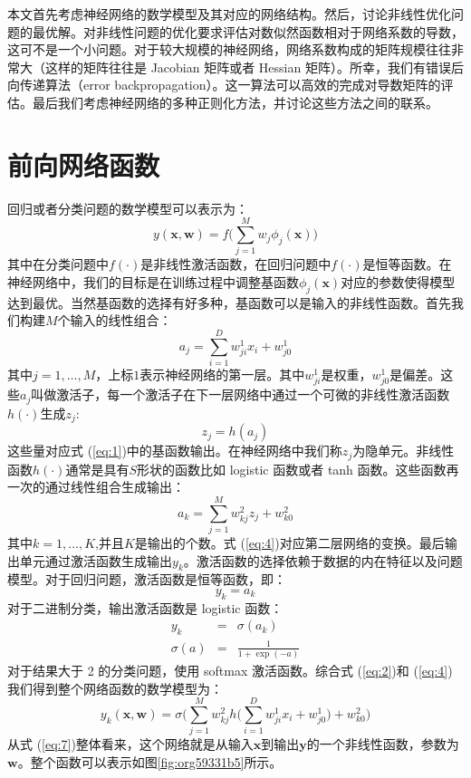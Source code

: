 \documentclass[10pt,a4paper,UTF8]{article}
\begin{document}
本文首先考虑神经网络的数学模型及其对应的网络结构。然后，讨论非线性优化问题的最优解。对非线性问题的优化要求评估对数似然函数相对于网络系数的导数，这可不是一个小问题。对于较大规模的神经网络，网络系数构成的矩阵规模往往非常大（这样的矩阵往往是 Jacobian 矩阵或者 Hessian 矩阵）。所幸，我们有错误后向传递算法（error backpropagation）。这一算法可以高效的完成对导数矩阵的评估。最后我们考虑神经网络的多种正则化方法，并讨论这些方法之间的联系。
\section{前向网络函数}
\label{sec:org1c4e898}


回归或者分类问题的数学模型可以表示为：
\begin{equation}
\label{eq:1}
y(\mathbf{x},\mathbf{w}) = f\bigg( \sum_{j=1}^{M} w_{j}\phi_{j}(\mathbf{x}) \bigg)
\end{equation}
其中在分类问题中\(f(\cdot)\)是非线性激活函数，在回归问题中\(f(\cdot)\)是恒等函数。在神经网络中，我们的目标是在训练过程中调整基函数\(\phi_{j}(\mathbf{x})\)对应的参数使得模型达到最优。当然基函数的选择有好多种，基函数可以是输入的非线性函数。首先我们构建\(M\)个输入的线性组合：
\begin{equation}
\label{eq:2}
a_{j} = \sum_{i=1}^{D}w_{ji}^{1}x_{i} + w_{j0}^{1}
\end{equation}
其中\(j = 1,\ldots ,M\)，上标\(1\)表示神经网络的第一层。其中\(w_{ji}^{1}\)是权重，\(w_{j0}^{1}\)是偏差。这些\(a_{j}\)叫做激活子，每一个激活子在下一层网络中通过一个可微的非线性激活函数\(h(\cdot)\)生成\(z_{j}\):
\begin{equation}
\label{eq:3}
z_{j} = h(a_{j})
\end{equation}
这些量对应式 (\ref{eq:1})中的基函数输出。在神经网络中我们称\(z_{j}\)为隐单元。非线性函数\(h(\cdot)\)通常是具有\(S\)形状的函数比如 logistic 函数或者 tanh 函数。这些函数再一次的通过线性组合生成输出：
\begin{equation}
\label{eq:4}
a_{k} = \sum_{j=1}^{M}w_{kj}^{2}z_{j} + w_{k0}^{2}
\end{equation}
其中\(k= 1,\ldots ,K\),并且\(K\)是输出的个数。式 (\ref{eq:4})对应第二层网络的变换。最后输出单元通过激活函数生成输出\(y_{k}\)。激活函数的选择依赖于数据的内在特征以及问题模型。对于回归问题，激活函数是恒等函数，即：
\begin{equation}
\label{eq:5}
y_{k} = a_{k}
\end{equation}
对于二进制分类，输出激活函数是 logistic 函数：
\begin{eqnarray}
\label{eq:6}
y_{k}&=&\sigma(a_{k}) \\
\sigma(a)  &=&\frac{1}{1+\exp(-a)}
\end{eqnarray}
对于结果大于 2 的分类问题，使用 softmax 激活函数。综合式 (\ref{eq:2})和 (\ref{eq:4})我们得到整个网络函数的数学模型为：
\begin{equation}
\label{eq:7}
y_{k}(\mathbf{x},\mathbf{w}) = \sigma \bigg( \sum_{j=1}^{M}w_{kj}^{2} h\bigg(\sum_{i=1}^{D}w_{ji}^{1}x_{i} + w_{j0}^{1} \bigg) + w_{k0}^{2}\bigg)
\end{equation}
从式 (\ref{eq:7})整体看来，这个网络就是从输入\(\mathbf{x}\)到输出\(\mathbf{y}\)的一个非线性函数，参数为\(\mathbf{w}\)。整个函数可以表示如图\ref{fig:org59331b5}所示。
\end{document}
